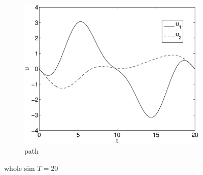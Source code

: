 \begin{figure}[h]
\begin{subfigure}[b]{\textwidth}
\centering
\includegraphics[height=0.3\textheight]{img/final_1_1_20_u.eps}
\caption{path}
\end{subfigure}
\caption{whole sim $T=20$}
\end{figure}

